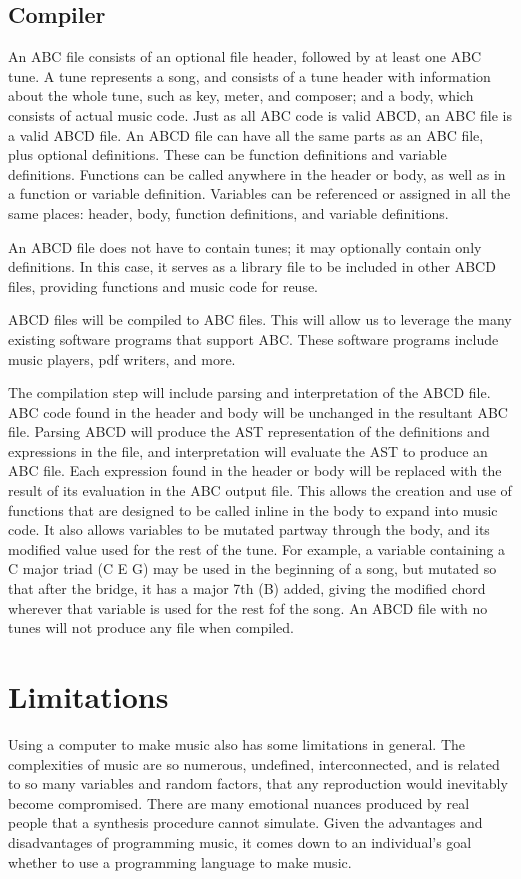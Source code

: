 \subsection{Compiler}
An ABC file consists of an optional file header, followed by at least one ABC tune. A tune represents a song, and consists of a tune header with information about the whole tune, such as key, meter, and composer; and a body, which consists of actual music code\cite{Walshaw11}. Just as all ABC code is valid ABCD, an ABC file is a valid ABCD file. An ABCD file can have all the same parts as an ABC file, plus optional definitions. These can be function definitions and variable definitions. Functions can be called anywhere in the header or body, as well as in a function or variable definition. Variables can be referenced or assigned in all the same places: header, body, function definitions, and variable definitions.
    
An ABCD file does not have to contain tunes; it may optionally contain only definitions. In this case, it serves as a library file to be included in other ABCD files, providing functions and music code for reuse.
    
ABCD files will be compiled to ABC files. This will allow us to leverage the many existing software programs that support ABC\cite{Walshaw17}. These software programs include music players, pdf writers, and more.

The compilation step will include parsing and interpretation of the ABCD file. ABC code found in the header and body will be unchanged in the resultant ABC file. Parsing ABCD will produce the AST representation of the definitions and expressions in the file, and interpretation will evaluate the AST to produce an ABC file. Each expression found in the header or body will be replaced with the result of its evaluation in the ABC output file. This allows the creation and use of functions that are designed to be called inline in the body to expand into music code. It also allows variables to be mutated partway through the body, and its modified value used for the rest of the tune. For example, a variable containing a C major triad (C E G) may be used in the beginning of a song, but mutated so that after the bridge, it has a major 7th (B) added, giving the modified chord wherever that variable is used for the rest fof the song. An ABCD file with no tunes will not produce any file when compiled.

\section{Limitations}
Using a computer to make music also has some limitations in general. The complexities of music are so numerous, undefined, interconnected, and is related to so many variables and random factors, that any reproduction would inevitably become compromised. There are many emotional nuances produced by real people that a synthesis procedure cannot simulate\cite{Dobrian88}.  Given the advantages and disadvantages of programming music, it comes down to an individual's goal whether to use a programming language to make music. 

